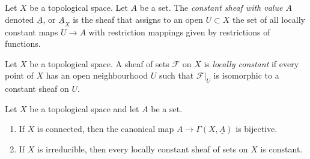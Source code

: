 \begin{definition}
\label{definition-constant-sheaf}
Let $X$ be a topological space. Let $A$ be a set.
The {\it constant sheaf with value $A$} denoted $\underline{A}$, or
$\underline{A}_X$ is the sheaf that assigns to an open $U \subset X$
the set of all locally constant maps $U \to A$ with restriction mappings
given by restrictions of functions.
\end{definition}

\begin{definition}
\label{definition-locally-constant-sheaf}
Let $X$ be a topological space. A sheaf of sets $\mathcal{F}$ on $X$
is {\it locally constant} if every point of $X$ has an open neighbourhood
$U$ such that $\mathcal{F}|_U$ is isomorphic to a constant sheaf on $U$.
\end{definition}

\begin{lemma}
\label{lemma-locally-constant-irreducible}
\begin{reference}
\cite[Chapter II, \S 1, no. 36, Lemmas 1 and 2, p. 229]{FAC}
\end{reference}
Let $X$ be a topological space and let $A$ be a set.
\begin{enumerate}
\item If $X$ is connected, then the canonical map
$A \to \Gamma(X, \underline{A})$ is bijective.
\item If $X$ is irreducible, then every locally constant sheaf of sets
on $X$ is constant.
\end{enumerate}
\end{lemma}

